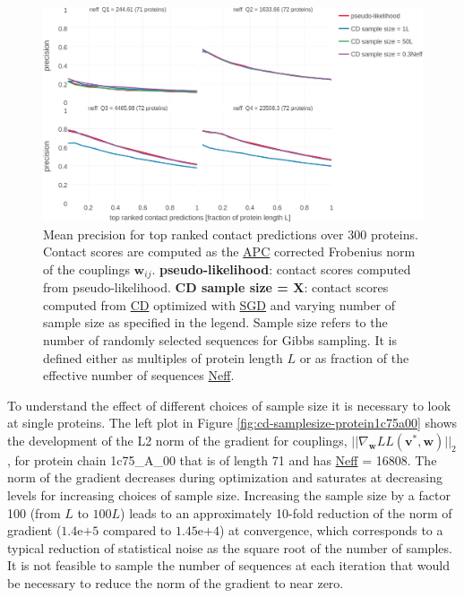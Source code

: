 \documentclass[11pt,a4paper,twoside]{book}
\renewcommand{\v}{\mathbf{v}}
\newcommand{\w}{\mathbf{w}}
\newcommand{\wij}{\mathbf{w}_{ij}}
\theoremstyle{definition}
\theoremstyle{definition}
\theoremstyle{remark}
\begin{document}
\begin{figure}

{\centering \includegraphics[width=1\linewidth]{img/full_likelihood/gibbs_sampling/precision_vs_rank_facetted_by_neff_samplesize} 

}

\caption{Mean precision for top
ranked contact predictions over 300 proteins. Contact scores are
computed as the \protect\hyperlink{abbrev}{APC} corrected Frobenius norm
of the couplings \(\wij\). \textbf{pseudo-likelihood}: contact scores
computed from pseudo-likelihood. \textbf{CD sample size = X}: contact
scores computed from \protect\hyperlink{abbrev}{CD} optimized with
\protect\hyperlink{abbrev}{SGD} and varying number of sample size as
specified in the legend. Sample size refers to the number of randomly
selected sequences for Gibbs sampling. It is defined either as multiples
of protein length \(L\) or as fraction of the effective number of
sequences \protect\hyperlink{abbrev}{Neff}.}\label{fig:cd-precision-sampling-size-neff}
\end{figure}

To understand the effect of different choices of sample size it is
necessary to look at single proteins. The left plot in Figure
\ref{fig:cd-samplesize-protein1c75a00} shows the development of the L2
norm of the gradient for couplings,
\(||\nabla_{\w} L\!L(\v^*, \w)||_2\), for protein chain 1c75\_A\_00 that
is of length 71 and has \protect\hyperlink{abbrev}{Neff} = 16808. The
norm of the gradient decreases during optimization and saturates at
decreasing levels for increasing choices of sample size. Increasing the
sample size by a factor 100 (from \(L\) to \(100L\)) leads to an
approximately 10-fold reduction of the norm of gradient
(\(\mathrm{1.4e}{+5}\) compared to \(\mathrm{1.45e}{+4}\)) at
convergence, which corresponds to a typical reduction of statistical
noise as the square root of the number of samples. It is not feasible to
sample the number of sequences at each iteration that would be necessary
to reduce the norm of the gradient to near zero.
\end{document}
